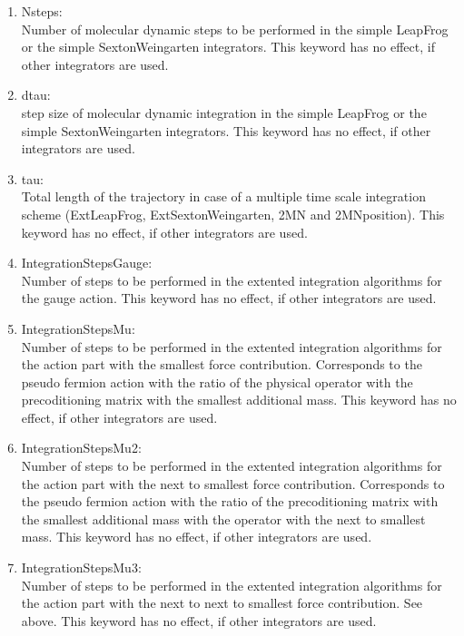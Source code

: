 \begin{enumerate}
\item {\ttfamily Nsteps}:\\
  Number of molecular dynamic steps to be performed in the simple
  {\ttfamily LeapFrog} or the simple {\ttfamily SextonWeingarten}
  integrators. This keyword has no effect, if other integrators are
  used.

\item {\ttfamily dtau}:\\
  step size of molecular dynamic integration in the simple
  {\ttfamily LeapFrog} or the simple {\ttfamily SextonWeingarten}
  integrators. This keyword has no effect, if other integrators are
  used.

\item {\ttfamily tau}:\\
  Total length of the trajectory in case of a multiple time scale
  integration scheme ({\ttfamily ExtLeapFrog}, {\ttfamily
    ExtSextonWeingarten}, {\ttfamily 2MN} and {\ttfamily
    2MNposition}). This keyword has no effect, if other integrators
  are used.

\item {\ttfamily IntegrationStepsGauge}:\\
  Number of steps to be performed in the extented integration
  algorithms for the gauge action. This keyword has no effect, if
  other integrators are used.

\item {\ttfamily IntegrationStepsMu}:\\
  Number of steps to be performed in the extented integration
  algorithms for the action part with the smallest force
  contribution. Corresponds to the pseudo fermion action with the
  ratio of the physical operator with the precoditioning matrix with
  the smallest additional mass. This keyword has no effect, if
  other integrators are used.

\item {\ttfamily IntegrationStepsMu2}:\\
  Number of steps to be performed in the extented integration
  algorithms for the action part with the next to smallest force
  contribution. Corresponds to the pseudo fermion action with the
  ratio of the precoditioning matrix with the smallest additional mass
  with the operator with the next to smallest mass. This keyword has
  no effect, if other integrators are used.

\item {\ttfamily IntegrationStepsMu3}:\\
  Number of steps to be performed in the extented integration
  algorithms for the action part with the next to next to smallest force
  contribution. See above. This keyword has
  no effect, if other integrators are used.


\end{enumerate}
